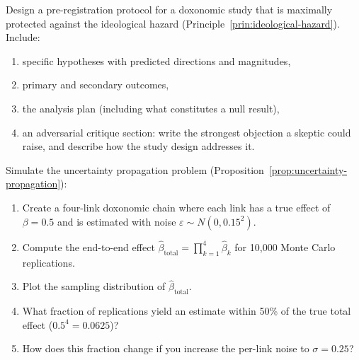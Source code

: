 \begin{exercise}
Design a pre-registration protocol for a doxonomic study that is maximally protected against the ideological hazard (Principle~\ref{prin:ideological-hazard}).
Include:
\begin{enumerate}[nosep]
  \item specific hypotheses with predicted directions and magnitudes,
  \item primary and secondary outcomes,
  \item the analysis plan (including what constitutes a null result),
  \item an adversarial critique section: write the strongest objection a skeptic could raise, and describe how the study design addresses it.
\end{enumerate}
\end{exercise}

\begin{exercise}[Computational]
Simulate the uncertainty propagation problem (Proposition~\ref{prop:uncertainty-propagation}):
\begin{enumerate}[nosep]
  \item Create a four-link doxonomic chain where each link has a true effect of $\beta = 0.5$ and is estimated with noise $\varepsilon \sim N(0, 0.15^2)$.
  \item Compute the end-to-end effect $\hat{\beta}_{\text{total}} = \prod_{k=1}^{4} \hat{\beta}_k$ for 10,000 Monte Carlo replications.
  \item Plot the sampling distribution of $\hat{\beta}_{\text{total}}$.
  \item What fraction of replications yield an estimate within 50\% of the true total effect ($0.5^4 = 0.0625$)?
  \item How does this fraction change if you increase the per-link noise to $\sigma = 0.25$?
\end{enumerate}
\end{exercise}
